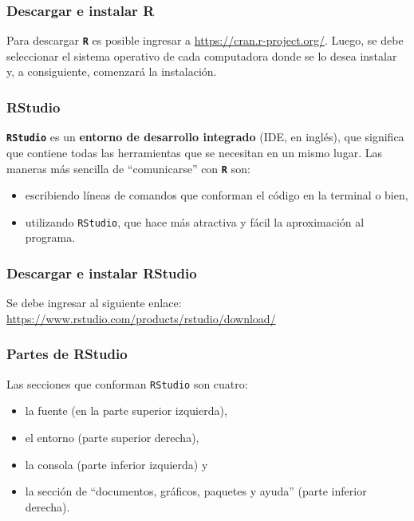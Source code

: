 \documentclass[
]{article}
\begin{document}
\hypertarget{descargar-e-instalar-r}{%
\subsubsection{Descargar e instalar R}\label{descargar-e-instalar-r}}

Para descargar \textbf{\texttt{R}} es posible ingresar a \url{https://cran.r-project.org/}. Luego, se debe seleccionar el sistema operativo de cada computadora donde se lo desea instalar y, a consiguiente, comenzará la instalación.

\hypertarget{rstudio}{%
\subsubsection{RStudio}\label{rstudio}}

\textbf{\texttt{RStudio}} es un \textbf{entorno de desarrollo integrado} (IDE, en inglés), que significa que contiene todas las herramientas que se necesitan en un mismo lugar. Las maneras más sencilla de ``comunicarse'' con \textbf{\texttt{R}} son:

\begin{itemize}
\item
  escribiendo líneas de comandos que conforman el código en la terminal o bien,
\item
  utilizando \texttt{RStudio}, que hace más atractiva y fácil la aproximación al programa.
\end{itemize}

\hypertarget{descargar-e-instalar-rstudio}{%
\subsubsection{Descargar e instalar RStudio}\label{descargar-e-instalar-rstudio}}

Se debe ingresar al siguiente enlace: \url{https://www.rstudio.com/products/rstudio/download/}

\hypertarget{partes-de-rstudio}{%
\subsubsection{Partes de RStudio}\label{partes-de-rstudio}}

Las secciones que conforman \texttt{RStudio} son cuatro:

\begin{itemize}
\item
  la fuente (en la parte superior izquierda),
\item
  el entorno (parte superior derecha),
\item
  la consola (parte inferior izquierda) y
\item
  la sección de ``documentos, gráficos, paquetes y ayuda'' (parte inferior derecha).
\end{itemize}
\end{document}
